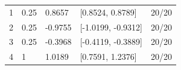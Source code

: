 \begin{tabular}{lllll}
1 & 0.25 & 0.8657 & [0.8524, 0.8789] & 20/20 \\
2 & 0.25 & -0.9755 & [-1.0199, -0.9312] & 20/20 \\
3 & 0.25 & -0.3968 & [-0.4119, -0.3889] & 20/20 \\
4 & 1 & 1.0189 & [0.7591, 1.2376] & 20/20 \\
\end{tabular}
